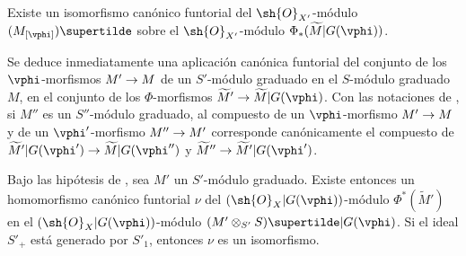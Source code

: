 \documentclass[oneside,10pt]{amsart}
\makeatletter
\newcommand{\ega@arrow}[2]{\mathchoice{#1}{#2}{#2}{#2}}
\renewcommand{\to}{\ega@arrow{\longrightarrow}{\rightarrow}}
\let\EGAOriginalLabel\label
\renewcommand{\label}[1]{\phantomsection\EGAOriginalLabel{#1}}
\makeatother
\begin{document}
\begin{proposition}[2.8.7]
\label{II.2.8.7}
Existe un isomorfismo canónico funtorial del $\sh{O}_{X'}$-módulo $(M_{[\vphi]})\supertilde$ sobre el $\sh{O}_{X'}$-módulo $\Phi_*(\widetilde{M}|G(\vphi))$.
\end{proposition}

Se deduce inmediatamente una aplicación canónica funtorial del conjunto de los $\vphi$-morfismos $M'\to M$ de un $S'$-módulo graduado en el $S$-módulo graduado $M$, en el conjunto de los $\Phi$-morfismos $\widetilde M'\to\widetilde{M}|G(\vphi)$.
Con las notaciones de , si $M''$ es un $S''$-módulo graduado, al compuesto de un $\vphi$-morfismo $M'\to M$ y de un $\vphi'$-morfismo $M''\to M'$ corresponde canónicamente el compuesto de $\widetilde M'|G(\vphi')\to\widetilde{M}|G(\vphi'')$ y $\widetilde M''\to\widetilde M'|G(\vphi')$.

\begin{proposition}[2.8.8]
\label{II.2.8.8}
Bajo las hipótesis de , sea $M'$ un $S'$-módulo graduado.
Existe entonces un homomorfismo canónico funtorial $\nu$ del $(\sh{O}_X|G(\vphi))$-módulo $\Phi^*(\widetilde M')$ en el $(\sh{O}_X|G(\vphi))$-módulo $(M'\otimes_{S'}S)\supertilde|G(\vphi)$.
Si el ideal $S'_+$ está generado por $S'_1$, entonces $\nu$ es un isomorfismo.
\end{proposition}
\end{document}
